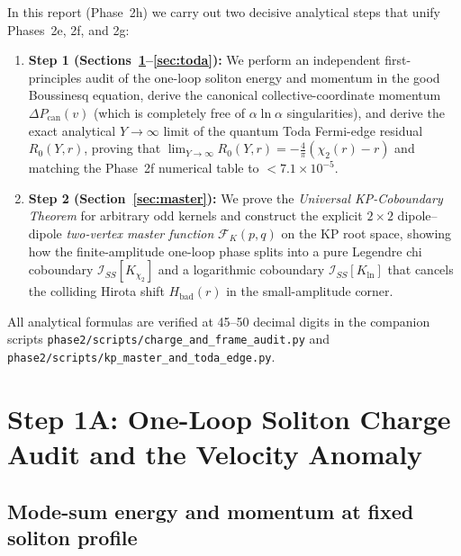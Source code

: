\documentclass[11pt,a4paper]{article}
\begin{document}
In this report (Phase~2h) we carry out two decisive analytical steps that unify
Phases~2e, 2f, and 2g:
\begin{enumerate}
\item \textbf{Step 1 (Sections~\ref{sec:audit}--\ref{sec:toda}):}
We perform an independent first-principles audit of the one-loop soliton energy
and momentum in the good Boussinesq equation, derive the canonical
collective-coordinate momentum $\Delta P_{\mathrm{can}}(v)$ (which is completely
free of $\alpha\ln\alpha$ singularities), and derive the exact analytical
$Y\to\infty$ limit of the quantum Toda Fermi-edge residual $R_0(Y,r)$, proving
that $\lim_{Y\to\infty} R_0(Y,r) = -\frac{4}{\pi}(\chi_2(r)-r)$ and matching the
Phase~2f numerical table to $< 7.1\times 10^{-5}$.
\item \textbf{Step 2 (Section~\ref{sec:master}):}
We prove the \emph{Universal KP-Coboundary Theorem} for arbitrary odd kernels and
construct the explicit $2\times 2$ dipole--dipole \emph{two-vertex master
function} $\mathcal{F}_K(p,q)$ on the KP root space, showing how the finite-amplitude
one-loop phase splits into a pure Legendre chi coboundary $\mathcal{I}_{SS}[K_{\chi_2}]$
and a logarithmic coboundary $\mathcal{I}_{SS}[K_{\ln}]$ that cancels the
colliding Hirota shift $H_{\mathrm{bad}}(r)$ in the small-amplitude corner.
\end{enumerate}

All analytical formulas are verified at 45--50 decimal digits in the companion
scripts \texttt{phase2/scripts/charge\_and\_frame\_audit.py} and
\texttt{phase2/scripts/kp\_master\_and\_toda\_edge.py}.

\section{Step 1A: One-Loop Soliton Charge Audit and the Velocity Anomaly}
\label{sec:audit}

\subsection{Mode-sum energy and momentum at fixed soliton profile}
\end{document}
